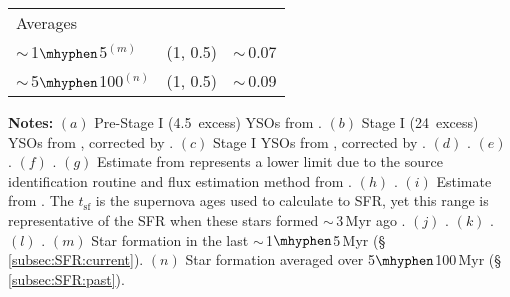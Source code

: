 \begin{table}[!ht]
\begin{tabular}{lcc}
    \multicolumn{3}{l}{\small Averages} \\ 
    \cline{0-0}
    \noalign{\smallskip} 
$\sim$\,1$\mhyphen$5$^{(m)}$            & (1, 0.5)  & $\sim$\,0.07 \\
$\sim$\,5$\mhyphen$100$^{(n)}$          & (1, 0.5)  & $\sim$\,0.09 \\

    \hline
    \end{tabular}

    \begin{minipage}{\columnwidth}\small
    \vspace{1mm} {\bf Notes:} 
    $(a)$ Pre-Stage I (4.5\micron\ excess) YSOs from \citet{Yusef-Zadeh2009}.
    $(b)$ Stage I (24\micron\ excess) YSOs from \citet{Yusef-Zadeh2009}, corrected by \citet{Koepferl2015}. 
    $(c)$ Stage I YSOs from \citep{Yusef-Zadeh2009}, corrected by \citet{An2011}.
    $(d)$ \citet{Immer2012b}.
    $(e)$ \citet{Nandakumar2018}.
    $(f)$ \citet{Lu2019a,Lu2019b}. 
    $(g)$ Estimate from \citet{Longmore2013b} represents a lower limit due to the source identification routine and flux estimation method from \citet{Lee2012}.
    $(h)$ \citet{Nguyen2021}. 
    $(i)$ Estimate from \citet{Ponti2015}. The $t_\mathrm{sf}$ is the supernova ages used to calculate to SFR, yet this range is representative of the SFR when these stars formed $\sim$\,3\,Myr ago \citep{Leitherer2014}. 
    $(j)$ \citet{Yusef-Zadeh2009}. 
    $(k)$ \citet{Crocker2011a}.   
    $(l)$ \citet{Barnes2017}.   
    $(m)$ Star formation in the last $\sim$\,1$\mhyphen$5\,Myr (\S\,\ref{subsec:SFR:current}).
    $(n)$ Star formation averaged over 5$\mhyphen$100\,Myr (\S\,\ref{subsec:SFR:past}).
    \end{minipage}
    \vspace{-2mm}
\end{table}

